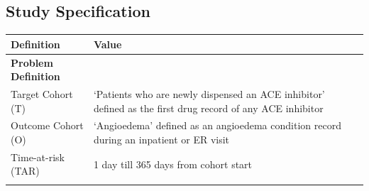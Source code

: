 \documentclass[
]{article}
\begin{document}
\hypertarget{study-specification-2}{%
\subsection{Study Specification}\label{study-specification-2}}

\begin{longtable}[]{@{}ll@{}}
\toprule
\begin{minipage}[b]{0.42\columnwidth}\raggedright
Definition\strut
\end{minipage} & \begin{minipage}[b]{0.52\columnwidth}\raggedright
Value\strut
\end{minipage}\tabularnewline
\midrule
\endhead
\begin{minipage}[t]{0.42\columnwidth}\raggedright
\textbf{Problem Definition}\strut
\end{minipage} & \begin{minipage}[t]{0.52\columnwidth}\raggedright
\strut
\end{minipage}\tabularnewline
\begin{minipage}[t]{0.42\columnwidth}\raggedright
Target Cohort (T)\strut
\end{minipage} & \begin{minipage}[t]{0.52\columnwidth}\raggedright
`Patients who are newly dispensed an ACE inhibitor' defined as the first
drug record of any ACE inhibitor\strut
\end{minipage}\tabularnewline
\begin{minipage}[t]{0.42\columnwidth}\raggedright
Outcome Cohort (O)\strut
\end{minipage} & \begin{minipage}[t]{0.52\columnwidth}\raggedright
`Angioedema' defined as an angioedema condition record during an
inpatient or ER visit\strut
\end{minipage}\tabularnewline
\begin{minipage}[t]{0.42\columnwidth}\raggedright
Time-at-risk (TAR)\strut
\end{minipage} & \begin{minipage}[t]{0.52\columnwidth}\raggedright
1 day till 365 days from cohort start\strut
\end{minipage}\tabularnewline
\begin{minipage}[t]{0.42\columnwidth}\raggedright
\strut
\end{minipage} & \begin{minipage}[t]{0.52\columnwidth}\raggedright
\strut
\end{minipage}\tabularnewline

\end{longtable}
\end{document}
